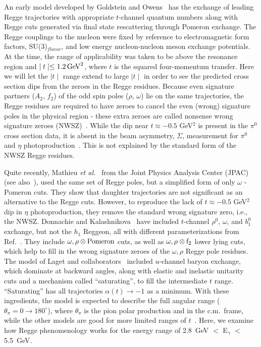 \documentclass[aps,prc,twocolumn,floatfix,showpacs,preprintnumbers,amsmath,amssymb,superscriptaddress,linenumbers]{revtex4-1}
\begin{document}
An early model developed by Goldstein and 
Owens~\cite{Goldstein:1973xn} has the exchange of leading Regge 
trajectories with appropriate $t$-channel quantum numbers along with 
Regge cuts generated via final state rescattering through Pomeron 
exchange. The Regge couplings to the nucleon were fixed by reference 
to electromagnetic form factors, SU(3)$_{flavor}$, and low energy 
nucleon-nucleon meson exchange potentials. At the time, the range of 
applicability was taken to be above the resonance region and $\mid 
t \mid \le 1.2 \, {\rm GeV}^2$, where $t$ is the squared 
four-momentum transfer. Here we will let the $\mid t \mid$ 
range extend to large $\mid t \mid$ in order to see the predicted cross 
section dips from the zeroes in the Regge residues. Because even signature partners ($A_2$, $f_2$) of the odd spin poles ($\rho$, $\omega$) lie on the same trajectories, the Regge residues are required to have zeroes to cancel the even (wrong) signature poles in the physical region - these extra zeroes are called nonsense wrong signature zeroes (NWSZ)~\cite{CHIU1971477}. While the dip near 
$t\approx -0.5$ GeV$^2$ is present in the $\pi^0$ cross section data, it is absent in the 
beam asymmetry, $\Sigma$, measurement for $\pi^{0}$ and $\eta$ 
photoproduction~\cite{AlGhoul:2017nbp}. This is not explained by the 
standard form of the NWSZ Regge residues. 
  
Quite recently, Mathieu {\it et al.}~\cite{Mathieu:2015eia} from the Joint Physics Analysis Center (JPAC)
(see also~\cite{Kashevarov:2017vyl}), used the same set of Regge poles, 
but a simplified form of only $\omega$ -Pomeron cuts. They show that 
daughter trajectories are not significant as an alternative to the 
Regge cuts. However, to reproduce the lack of $t\approx -0.5$ GeV$^2$ 
dip in $\eta$ photoproduction, they remove the standard wrong signature 
zero, i.e., the NWSZ.  Donnachie and Kalashnikova~\cite{Donnachie:2015jaa} 
have included $t$-channel $\rho^0$, $\omega$, and $b^0_1$ exchange, but not 
the $h_1$ Reggeon, all with different parameterizations from 
Ref.~\cite{Goldstein:1973xn}. They include $\omega, \rho \otimes {\rm 
Pomeron}$ cuts, as well as $\omega, \rho \otimes {\rm f}_2$ lower lying 
cuts, which help to fill in the wrong signature zeroes of the $\omega, 
\rho$ Regge pole residues. The model of Laget and collaborators~\cite{Laget:2005be} included 
$u$-channel baryon exchange, which dominate at backward angles, along with 
	elastic and inelastic unitarity cuts and a mechanism called ``saturating'', to fill the intermediate 
	$t$ range. ``Saturating''  has all trajectories $\alpha(t) \rightarrow -1$ as a minimum. With 
	these ingredients, the model is expected to describe the full angular range ($\theta_{\pi}= 0 \to 180^{\circ}$), where $\theta_{\pi}$ is the pion polar production and in the c.m.~frame,
	while the other models are good for more limited ranges of $t$~\cite{Goldstein:1973xn,Mathieu:2015eia, Donnachie:2015jaa}. 
Here, we examine how Regge phenomenology works for the energy range of 2.8~GeV $< $ E$_\gamma$ $<$ 5.5~GeV.
\end{document}
